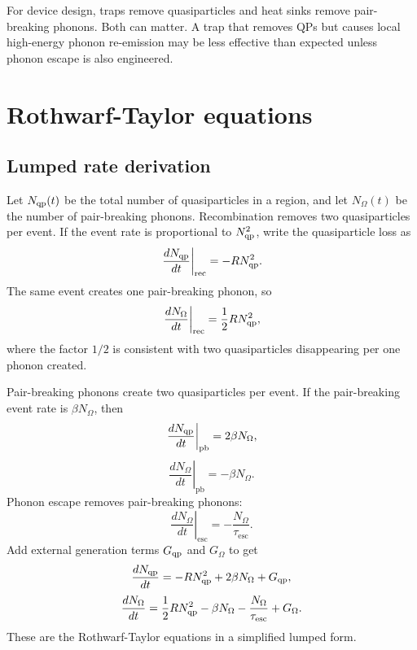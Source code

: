 \documentclass[11pt]{article}
\newcommand{\esc}{\mathrm{esc}}
\newcommand{\rec}{\mathrm{rec}}
\begin{document}
For device design, traps remove quasiparticles and heat sinks remove pair-breaking phonons. Both can matter. A trap that removes QPs but causes local high-energy phonon re-emission may be less effective than expected unless phonon escape is also engineered.

\section{Rothwarf-Taylor equations}

\subsection{Lumped rate derivation}
Let $N_{\mathrm{qp}}(t)$ be the total number of quasiparticles in a region, and let $N_{\Omega}(t)$ be the number of pair-breaking phonons. Recombination removes two quasiparticles per event. If the event rate is proportional to $N_{\mathrm{qp}}^2$, write the quasiparticle loss as
\begin{equation}
\left.\frac{dN_{\qp}}{dt}\right|_{\rec}=-R N_{\qp}^2.
\end{equation}
The same event creates one pair-breaking phonon, so
\begin{equation}
\left.\frac{dN_{\Omega}}{dt}\right|_{\rec}=\frac{1}{2}R N_{\qp}^2,
\end{equation}
where the factor $1/2$ is consistent with two quasiparticles disappearing per one phonon created.

Pair-breaking phonons create two quasiparticles per event. If the pair-breaking event rate is $\beta N_{\Omega}$, then
\begin{equation}
\left.\frac{dN_{\mathrm{qp}}}{dt}\right|_{\mathrm{pb}}=2\beta N_{\Omega},
\end{equation}
\begin{equation}
\left.\frac{dN_{\Omega}}{dt}\right|_{\mathrm{pb}}=-\beta N_{\Omega}.
\end{equation}
Phonon escape removes pair-breaking phonons:
\begin{equation}
\left.\frac{dN_{\Omega}}{dt}\right|_{\esc}=-\frac{N_{\Omega}}{\tau_{\esc}}.
\end{equation}
Add external generation terms $G_{\mathrm{qp}}$ and $G_\Omega$ to get
\begin{equation}
\frac{dN_{\mathrm{qp}}}{dt}=-R N_{\mathrm{qp}}^2+2\beta N_\Omega+G_{\mathrm{qp}},
\label{eq:rt_lumped_qp}
\end{equation}
\begin{equation}
\frac{dN_\Omega}{dt}=\frac{1}{2}R N_{\qp}^2-\beta N_\Omega-\frac{N_\Omega}{\tau_{\esc}}+G_\Omega.
\label{eq:rt_lumped_ph}
\end{equation}
These are the Rothwarf-Taylor equations in a simplified lumped form.
\end{document}

